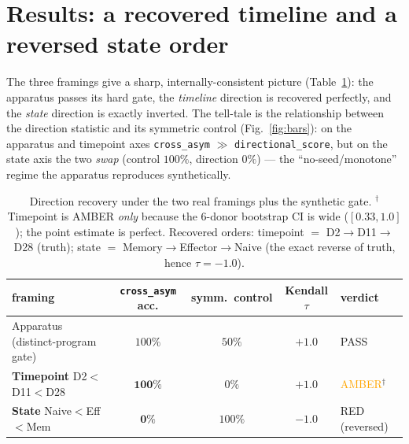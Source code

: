 \documentclass[11pt]{article}
\begin{document}
\section{Results: a recovered timeline and a reversed state order}
The three framings give a sharp, internally-consistent picture (Table~\ref{tab:main}): the
apparatus passes its hard gate, the \emph{timeline} direction is recovered perfectly, and the
\emph{state} direction is exactly inverted. The tell-tale is the relationship between the
direction statistic and its symmetric control (Fig.~\ref{fig:bars}): on the apparatus and
timepoint axes \texttt{cross\_asym} $\gg$ \texttt{directional\_score}, but on the state axis the
two \emph{swap} (control $100\%$, direction $0\%$) --- the ``no-seed/monotone'' regime the
apparatus reproduces synthetically.

\begin{table}[h]
\centering
\small
\begin{tabular}{lcccl}
\toprule
framing & \texttt{cross\_asym} acc. & symm.\ control & Kendall $\tau$ & verdict \\
\midrule
Apparatus (distinct-program gate) & $100\%$ & $50\%$ & $+1.0$ & \textcolor{good}{PASS} \\
\textbf{Timepoint} D2$<$D11$<$D28 & $\mathbf{100\%}$ & $0\%$ & $\mathbf{+1.0}$ & \textcolor{orange}{AMBER}$^\dagger$ \\
\textbf{State} Naive$<$Eff$<$Mem & $\mathbf{0\%}$ & $100\%$ & $\mathbf{-1.0}$ & \textcolor{bad}{RED (reversed)} \\
\bottomrule
\end{tabular}
\caption{Direction recovery under the two real framings plus the synthetic gate.
$^\dagger$Timepoint is AMBER \emph{only} because the 6-donor bootstrap CI is wide
($[0.33,1.0]$); the point estimate is perfect. Recovered orders: timepoint
$=$ D2$\rightarrow$D11$\rightarrow$D28 (truth); state $=$
Memory$\rightarrow$Effector$\rightarrow$Naive (the exact reverse of truth, hence $\tau=-1.0$).}
\label{tab:main}
\end{table}
\end{document}
